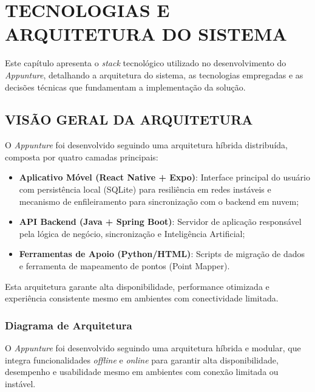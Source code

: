 \chapter{TECNOLOGIAS E ARQUITETURA DO SISTEMA} \label{cha:tecnologias}

Este capítulo apresenta o \textit{stack} tecnológico utilizado no desenvolvimento do \textit{Appunture}, detalhando a arquitetura do sistema, as tecnologias empregadas e as decisões técnicas que fundamentam a implementação da solução.

\section{VISÃO GERAL DA ARQUITETURA} \label{sec:visao_arquitetura}

O \textit{Appunture} foi desenvolvido seguindo uma arquitetura híbrida distribuída, composta por quatro camadas principais:

\begin{itemize}
    \item \textbf{Aplicativo Móvel (React Native + Expo)}: Interface principal do usuário com persistência local (SQLite) para resiliência em redes instáveis e mecanismo de enfileiramento para sincronização com o backend em nuvem;
    \item \textbf{API Backend (Java + Spring Boot)}: Servidor de aplicação responsável pela lógica de negócio, sincronização e Inteligência Artificial;
    \item \textbf{Ferramentas de Apoio (Python/HTML)}: Scripts de migração de dados e ferramenta de mapeamento de pontos (Point Mapper).
\end{itemize}

Esta arquitetura garante alta disponibilidade, performance otimizada e experiência consistente mesmo em ambientes com conectividade limitada.

\subsection{Diagrama de Arquitetura}

O \textit{Appunture} foi desenvolvido seguindo uma arquitetura híbrida e modular, que integra funcionalidades \textit{offline} e \textit{online} para garantir alta disponibilidade, desempenho e usabilidade mesmo em ambientes com conexão limitada ou instável.

